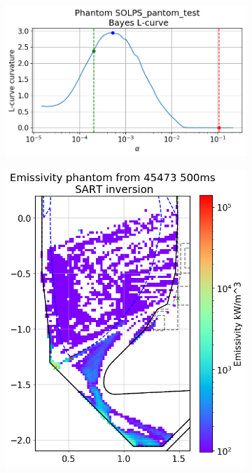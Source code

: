 \begin{figure}
\begin{subfigure}{0.45\linewidth}
         \includegraphics[trim={0 0 0 45},clip,width=\textwidth]{Chapters/chapter2/figs/inversion_comparison_L_curve_curvature_SOLPS_pantom_test-Bayes.png}
         \caption{}
         \label{fig:SOLPS_phantom2d}
     \end{subfigure}
     \begin{subfigure}{0.45\linewidth}
         \centering
         \includegraphics[trim={0 0 0 45},clip,width=\textwidth]{Chapters/chapter2/figs/inversion_comparison_emissivity_SOLPS_pantom_test-SART.png}

\end{subfigure}
\end{figure}
